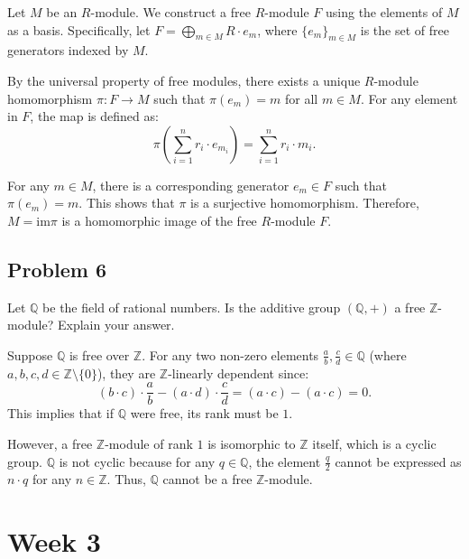 \begin{solution}
    Let $M$ be an $R$-module. We construct a free $R$-module $F$ using the elements of $M$ as a basis. Specifically, let $F = \bigoplus_{m \in M} R \cdot e_m$, where $\{e_m\}_{m \in M}$ is the set of free generators indexed by $M$.

By the universal property of free modules, there exists a unique $R$-module homomorphism $\pi: F \to M$ such that $\pi(e_m) = m$ for all $m \in M$. For any element in $F$, the map is defined as:
\[ \pi\left( \sum_{i=1}^n r_i \cdot e_{m_i} \right) = \sum_{i=1}^n r_i \cdot m_i. \]

For any $m \in M$, there is a corresponding generator $e_m \in F$ such that $\pi(e_m) = m$. This shows that $\pi$ is a surjective homomorphism. Therefore, $M = \text{im} \pi$ is a homomorphic image of the free $R$-module $F$.
\end{solution}

\subsection*{Problem 6}
Let $\mathbb{Q}$ be the field of rational numbers. Is the additive group $(\mathbb{Q}, +)$ a free $\mathbb{Z}$-module? Explain your answer.

\begin{solution}
Suppose $\mathbb{Q}$ is free over $\mathbb{Z}$. For any two non-zero elements $\frac{a}{b}, \frac{c}{d} \in \mathbb{Q}$ (where $a, b, c, d \in \mathbb{Z} \setminus \{0\}$), they are $\mathbb{Z}$-linearly dependent since:
\[ (b \cdot c) \cdot \frac{a}{b} - (a \cdot d) \cdot \frac{c}{d} = (a \cdot c) - (a \cdot c) = 0. \]
This implies that if $\mathbb{Q}$ were free, its rank must be $1$. 

However, a free $\mathbb{Z}$-module of rank $1$ is isomorphic to $\mathbb{Z}$ itself, which is a cyclic group. $\mathbb{Q}$ is not cyclic because for any $q \in \mathbb{Q}$, the element $\frac{q}{2}$ cannot be expressed as $n \cdot q$ for any $n \in \mathbb{Z}$. Thus, $\mathbb{Q}$ cannot be a free $\mathbb{Z}$-module.
\end{solution}

\section{Week 3}

